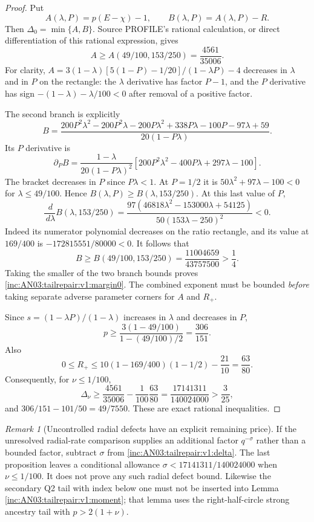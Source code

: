\documentclass[11pt]{article}
\theoremstyle{remark}\newtheorem{remark}[theorem]{Remark}
\newcommand{\dd}{\,d}\newcommand{\E}{\mathbb E}
\begin{document}
\begin{proof}
Put
\[
 A(\lambda,P)=p(E-\chi)-1,\qquad B(\lambda,P)=A(\lambda,P)-R.
\]
Then $\Delta_0=\min\{A,B\}$. Source PROFILE's rational calculation, or direct differentiation of this rational expression, gives
\[
 A\ge A(49/100,153/250)=\frac{4561}{35006}.
\]
For clarity, $A=3(1-\lambda)[5(1-P)-1/20]/(1-\lambda P)-4$ decreases in $\lambda$ and in $P$ on the rectangle: the $\lambda$ derivative has factor $P-1$, and the $P$ derivative has sign $-(1-\lambda)-\lambda/100<0$ after removal of a positive factor.

The second branch is explicitly
\[
 B=\frac{200P^2\lambda^2-200P^2\lambda-200P\lambda^2
                   +338P\lambda-100P-97\lambda+59}
              {20(1-P\lambda)}.
\]
Its $P$ derivative is
\[
 \partial_P B=\frac{1-\lambda}{20(1-P\lambda)^2}
 [200P^2\lambda^2-400P\lambda+297\lambda-100].
\]
The bracket decreases in $P$ since $P\lambda<1$. At $P=1/2$ it is $50\lambda^2+97\lambda-100<0$ for $\lambda\le49/100$. Hence $B(\lambda,P)\ge B(\lambda,153/250)$. At this last value of $P$,
\[
 \frac{\dd}{\dd\lambda}B(\lambda,153/250)
 =\frac{97(46818\lambda^2-153000\lambda+54125)}
              {50(153\lambda-250)^2}<0.
\]
Indeed its numerator polynomial decreases on the ratio rectangle, and its value at $169/400$ is $-172815551/80000<0$. It follows that
\[
 B\ge B(49/100,153/250)=\frac{11004659}{43757500}>\frac14.
\]
Taking the smaller of the two branch bounds proves \eqref{inc:AN03:tailrepair:v1:margin0}. The combined exponent must be bounded \emph{before} taking separate adverse parameter corners for $A$ and $R_+$.

Since $s=(1-\lambda P)/(1-\lambda)$ increases in $\lambda$ and decreases in $P$,
\[
 p\ge\frac{3(1-49/100)}{1-(49/100)/2}=\frac{306}{151}.
\]
Also
\[
 0\le R_+\le10(1-169/400)(1-1/2)-\frac{21}{10}=\frac{63}{80}.
\]
Consequently, for $\nu\le1/100$,
\[
 \Delta_\nu\ge\frac{4561}{35006}-\frac1{100}\frac{63}{80}
 =\frac{17141311}{140024000}>\frac3{25},
\]
and $306/151-101/50=49/7550$. These are exact rational inequalities.
\end{proof}

\begin{remark}[Uncontrolled radial defects have an explicit remaining price]
If the unresolved radial-rate comparison supplies an additional factor $q^{-\sigma}$ rather than a bounded factor, subtract $\sigma$ from \eqref{inc:AN03:tailrepair:v1:delta}. The last proposition leaves a conditional allowance $\sigma<17141311/140024000$ when $\nu\le1/100$. It does not prove any such radial defect bound. Likewise the secondary Q2 tail with index below one must not be inserted into Lemma \ref{inc:AN03:tailrepair:v1:moment}; that lemma uses the right-half-circle strong ancestry tail with $p>2(1+\nu)$.
\end{remark}
\end{document}
